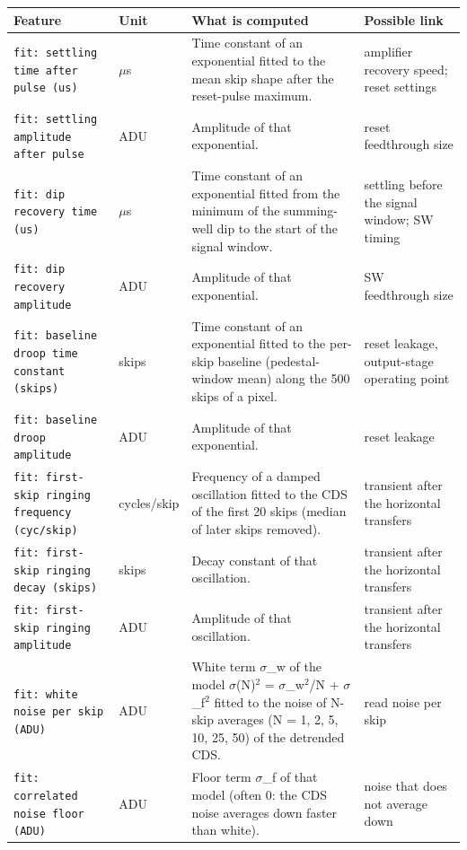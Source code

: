 \documentclass[10pt]{article}
\begin{document}
\begin{longtable}{>{\raggedright\arraybackslash}p{}>{\raggedright\arraybackslash}p{}>{\raggedright\arraybackslash}p{}>{\raggedright\arraybackslash}p{}}
\toprule Feature & Unit & What is computed & Possible link \\ \midrule \endhead
\bottomrule \endfoot
\texttt{fit: settling time after pulse (us)} & $\mu$s & Time constant of an exponential fitted to the mean skip shape after the reset-pulse maximum. & amplifier recovery speed; reset settings \\
\texttt{fit: settling amplitude after pulse} & ADU & Amplitude of that exponential. & reset feedthrough size \\
\texttt{fit: dip recovery time (us)} & $\mu$s & Time constant of an exponential fitted from the minimum of the summing-well dip to the start of the signal window. & settling before the signal window; SW timing \\
\texttt{fit: dip recovery amplitude} & ADU & Amplitude of that exponential. & SW feedthrough size \\
\texttt{fit: baseline droop time constant (skips)} & skips & Time constant of an exponential fitted to the per-skip baseline (pedestal-window mean) along the 500 skips of a pixel. & reset leakage, output-stage operating point \\
\texttt{fit: baseline droop amplitude} & ADU & Amplitude of that exponential. & reset leakage \\
\texttt{fit: first-skip ringing frequency (cyc/skip)} & cycles/skip & Frequency of a damped oscillation fitted to the CDS of the first 20 skips (median of later skips removed). & transient after the horizontal transfers \\
\texttt{fit: first-skip ringing decay (skips)} & skips & Decay constant of that oscillation. & transient after the horizontal transfers \\
\texttt{fit: first-skip ringing amplitude} & ADU & Amplitude of that oscillation. & transient after the horizontal transfers \\
\texttt{fit: white noise per skip (ADU)} & ADU & White term $\sigma$\_w of the model $\sigma$(N)$^{2}$ = $\sigma$\_w$^{2}$/N + $\sigma$\_f$^{2}$ fitted to the noise of N-skip averages (N = 1, 2, 5, 10, 25, 50) of the detrended CDS. & read noise per skip \\
\texttt{fit: correlated noise floor (ADU)} & ADU & Floor term $\sigma$\_f of that model (often 0: the CDS noise averages down faster than white). & noise that does not average down \\
\end{longtable}
\end{document}
